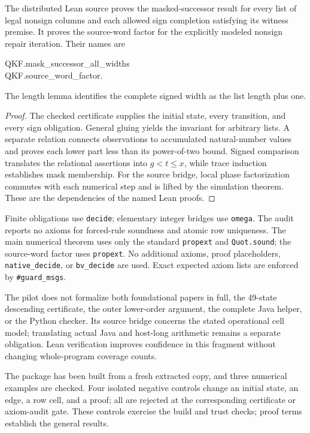 \begin{theorem}\label{thm:leanpilot}
The distributed Lean source proves the masked-successor result for every list of legal nonsign columns and each allowed sign completion satisfying its witness premise. It proves the source-word factor for the explicitly modeled nonsign repair iteration. Their names are
\begin{center}\normalfont\small\ttfamily
QKF.mask\_successor\_all\_widths\\
QKF.source\_word\_factor.
\end{center}
The length lemma identifies the complete signed width as the list length plus one.
\end{theorem}
\begin{proof}
The checked certificate supplies the initial state, every transition, and every sign obligation. General gluing yields the invariant for arbitrary lists. A separate relation connects observations to accumulated natural-number values and proves each lower part less than its power-of-two bound. Signed comparison translates the relational assertions into $g<t\le x$, while trace induction establishes mask membership. For the source bridge, local phase factorization commutes with each numerical step and is lifted by the simulation theorem. These are the dependencies of the named Lean proofs.
\end{proof}

Finite obligations use \texttt{decide}; elementary integer bridges use \texttt{omega}. The audit reports no axioms for forced-rule soundness and atomic row uniqueness. The main numerical theorem uses only the standard \texttt{propext} and \texttt{Quot.sound}; the source-word factor uses \texttt{propext}. No additional axioms, proof placeholders, \texttt{native\_decide}, or \texttt{bv\_decide} are used. Exact expected axiom lists are enforced by \texttt{\#guard\_msgs}.

The pilot does not formalize both foundational papers in full, the 49-state descending certificate, the outer lower-order argument, the complete Java helper, or the Python checker. Its source bridge concerns the stated operational cell model; translating actual Java and host-long arithmetic remains a separate obligation. Lean verification improves confidence in this fragment without changing whole-program coverage counts.

The package has been built from a fresh extracted copy, and three numerical examples are checked. Four isolated negative controls change an initial state, an edge, a row cell, and a proof; all are rejected at the corresponding certificate or axiom-audit gate. These controls exercise the build and trust checks; proof terms establish the general results.
